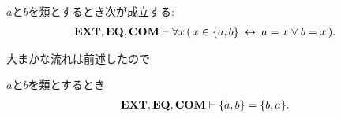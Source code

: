 	\begin{screen}
		\begin{thm}[対は表示されている要素しか持たない]
		\label{thm:pair_members_are_exactly_the_given_two}
			$a$と$b$を類とするとき次が成立する:
			\begin{align}
				\mbox{{\bf EXT}},\mbox{{\bf EQ}},\mbox{\bf COM} \vdash 
				\forall x\, (\, x \in \{a,b\} \hspace{0.25em}\leftrightarrow\hspace{0.25em} a = x \vee b = x\, ).
			\end{align}
		\end{thm}
	\end{screen}
	
	\begin{sketch}
		大まかな流れは前述したので
	\end{sketch}
	
	\begin{screen}
		\begin{thm}[要素の表示の順番を入れ替えても対は等しい]\label{thm:commutative_law_of_pairs}
			$a$と$b$を類とするとき
			\begin{align}
				\mbox{{\bf EXT}},\mbox{{\bf EQ}},\mbox{\bf COM} \vdash \{a,b\} = \{b,a\}.
			\end{align}
		\end{thm}
	\end{screen}
	
